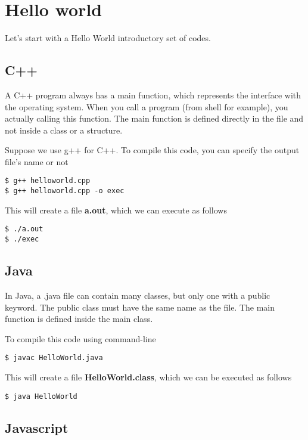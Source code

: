 \documentclass{KodeBook}
\begin{document}
\section{Hello world}

Let's start with a Hello World introductory set of codes. 


\subsection{C++}

A C++ program always has a main function, which represents the interface with the operating system. 
When you call a program (from shell for example), you actually calling this function. 
The main function is defined directly in the file and not inside a class or a structure.
%

%

Suppose we use g++ for C++. 
To compile this code, you can specify the output file's name or not
\begin{lstlisting}[style=shellStyle]
$ g++ helloworld.cpp 
$ g++ helloworld.cpp -o exec 
\end{lstlisting}
This will create a file \textbf{a.out}, which we can execute as follows
\begin{lstlisting}[style=shellStyle]
$ ./a.out
$ ./exec 
\end{lstlisting}

\subsection{Java}

In Java, a .java file can contain many classes, but only one with a public keyword. 
The public class must have the same name as the file. 
The main function is defined inside the main class.



To compile this code using command-line
\begin{lstlisting}[style=shellStyle]
$ javac HelloWorld.java
\end{lstlisting}
This will create a file \textbf{HelloWorld.class}, which we can be executed as follows
\begin{lstlisting}[style=shellStyle]
$ java HelloWorld
\end{lstlisting}

\subsection{Javascript}
\end{document}
